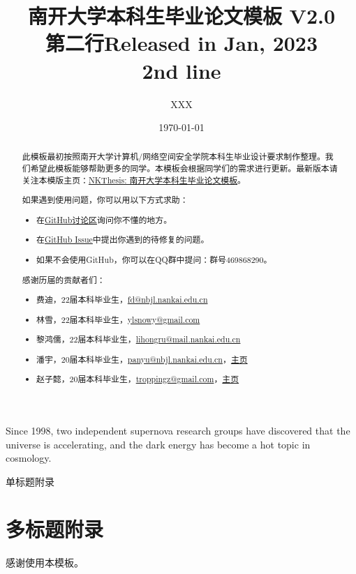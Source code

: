 \documentclass{nkuthesis}
\title{南开大学本科生毕业论文模板 V2.0 \\ 第二行}
\title*{Released in Jan, 2023 \\ 2nd line}
\author{XXX}
\date{\today}
\begin{document}

\maketitle
\declaration

\begin{abstract}
此模板最初按照南开大学计算机/网络空间安全学院本科生毕业设计要求制作整理。我们希望此模板能够帮助更多的同学。本模板会根据同学们的需求进行更新。最新版本请关注本模版主页：\href{https://tr0py.github.io/NKU-thesis-template-2020/}{NKThesis: 南开大学本科生毕业论文模板}。
  
如果遇到使用问题，你可以用以下方式求助：
\begin{itemize}
  \item 在\href{https://github.com/Tr0py/NKU-thesis-template-2020/discussions}{GitHub讨论区}询问你不懂的地方。
  \item 在\href{https://github.com/Tr0py/NKU-thesis-template-2020/issues}{GitHub Issue}中提出你遇到的待修复的问题。
  \item 如果不会使用GitHub，你可以在QQ群中提问：群号469868290。
\end{itemize}

感谢历届的贡献者们：
\begin{itemize}
    \item 费迪，22届本科毕业生，\url{fd@nbjl.nankai.edu.cn}
    \item 林雪，22届本科毕业生，\url{ylsnowy@gmail.com}
    \item 黎鸿儒，22届本科毕业生，\url{lihongru@mail.nankai.edu.cn}
    \item 潘宇，20届本科毕业生，\url{panyu@nbjl.nankai.edu.cn}，\href{https://nbjl.nankai.edu.cn/2019/0513/c19244a264683/page.htm}{主页}
    \item 赵子懿，20届本科毕业生，\url{troppingz@gmail.com}，\href{https://tr0py.github.io/}{主页}
\end{itemize}
\end{abstract}
  
\begin{abstract*}
Since 1998, two independent supernova research groups have discovered that the universe is accelerating, and the dark energy has become a hot topic in cosmology. 
\end{abstract*}

\tableofcontents



\appendix*
单标题附录

\appendix
\section{多标题附录}

% 
\begin{reference}
\printbibliography[category=cited,heading=none]
\end{reference}

\begin{acknowledgement}
  感谢使用本模板。
\end{acknowledgement}
\end{document}
